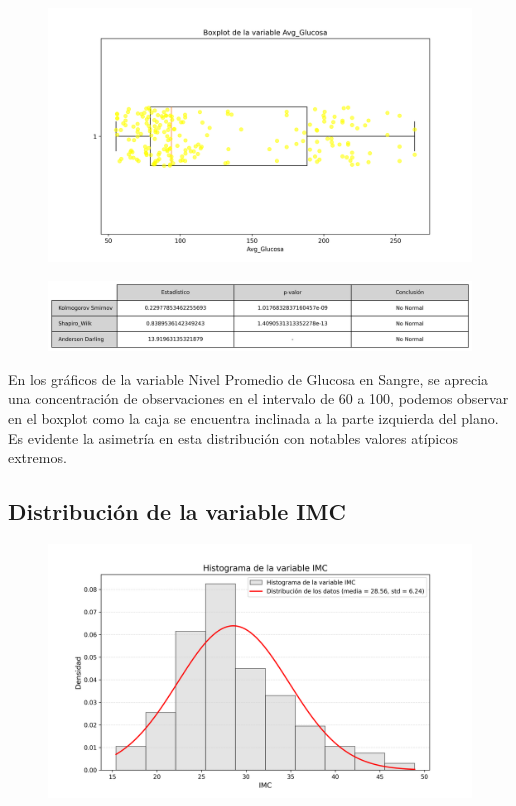 \documentclass[a4paper, 12pt]{article}
\begin{document}
\begin{figure}[H]
    \centering
    \includegraphics[width=1\textwidth]{img/Boxplot/Boxplt_Avg_Glucosa.png}
\end{figure}

\begin{figure}[H]
    \centering
    \includegraphics[width=1\textwidth]{img/Tablas/test_normalidad_Avg_Glucosa.png}
\end{figure}

En los gráficos de la variable Nivel Promedio de Glucosa en Sangre, se aprecia una concentración de observaciones en el intervalo de 60 a 100, podemos observar en el boxplot como la caja se encuentra inclinada a la parte izquierda del plano.
Es evidente la asimetría en esta distribución con notables valores atípicos extremos.



\subsection{Distribución de la variable IMC}

\begin{figure}[H]
    \centering
    \includegraphics[width=1\textwidth]{img/Histogramas/Histograma_IMC.png}
\end{figure}
\end{document}
